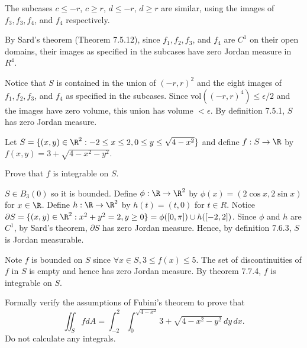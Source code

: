 \documentclass{exam}
\begin{document}
\begin{questions}
\begin{parts}
\begin{answer}{590pt}
The subcases $c \leq -r$, $c \geq r$, $d \leq -r$, $d \geq r$ are similar, using the images of $f_3, f_3, f_4$, and $f_4$ respectively.\newline\

By Sard's theorem (Theorem 7.5.12), since $f_1, f_2, f_3$, and $f_4$ are $C^1$ on their open domains, their images as specified in the subcases have zero Jordan measure in $R^4$.\newline\

Notice that $S$ is contained in the union of $(-r,r)^2$ and the eight images of $f_1, f_2, f_3$, and $f_4$ as specified in the subcases. Since vol$((-r,r)^4) \leq \epsilon/2$ and the images have zero volume, this union has volume $< \epsilon$. By definition 7.5.1, $S$ has zero Jordan measure.

\end{answer}

\end{parts}


\pagebreak

\question \label{Fubini} Let $S = \{ (x,y) \in \R^2 : -2 \leq x \leq 2, 0 \leq y \leq \sqrt{4-x^2} \}$ and define $f : S \to \R$ by $f(x,y) = 3+\sqrt{4-x^2-y^2}$.
\begin{parts}

\item Prove that $f$ is integrable on $S$.
\begin{answer}{580pt}
$S \in B_3(0)$ so it is bounded. Define $\phi : \R \to \R^2$ by $\phi(x) = (2 \cos x, 2 \sin x)$ for $x \in \R$. Define $h: \R \to \R^2$ by $h(t) = (t, 0)$ for $t \in R$. Notice $\partial S = \{ (x,y) \in \R^2 : x^2 + y^2 = 2, y \geq 0 \} = \phi([ 0, \pi ]) \cup h([-2, 2])$. Since $\phi$ and $h$ are $C^1$, by Sard's theorem, $\partial S$ has zero Jordan measure. Hence, by definition 7.6.3, $S$ is Jordan measurable.\newline\

Note $f$ is bounded on $S$ since $\forall x \in S, 3 \leq f(x) \leq 5$. The set of discontinuities of $f$ in $S$ is empty and hence has zero Jordan measure. By theorem 7.7.4, $f$ is integrable on $S$.
\end{answer}
	
\item Formally verify the assumptions of Fubini's theorem to prove that 
\[
\iint_S f dA = \int_{-2}^2 \int_0^{\sqrt{4-x^2}} 3+\sqrt{4-x^2-y^2} \, dy \, dx.  
\]	
Do not calculate any integrals. 
\begin{answer}{570pt}


\end{answer}
\end{parts}
\end{questions}
\end{document}
